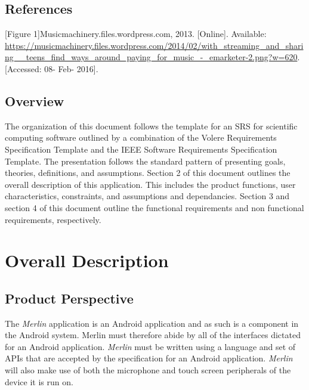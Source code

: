 \documentclass[]{article}
\newcommand{\merlin}{\textit{Merlin }}
\begin{document}
\subsection{References}
\label{sub:references}
\cbstart

[Figure 1]Musicmachinery.files.wordpress.com, 2013. [Online]. Available: \url{https://musicmachinery.files.wordpress.com/2014/02/with_streaming_and_sharing__teens_find_ways_around_paying_for_music_-_emarketer-2.png?w=620}. [Accessed: 08- Feb- 2016].
\cbend

\subsection{Overview}
\label{sub:overview}
	The organization of this document follows the template for an SRS for scientific computing software outlined by a combination of the Volere Requirements Specification Template and the IEEE Software Requirements Specification Template. The presentation follows the standard pattern of presenting goals, theories, definitions, and assumptions. Section 2 of this document outlines the overall description of this application. This includes the product functions, user characteristics, constraints, and assumptions and dependancies. Section 3 and section 4 of this document outline the functional requirements and non functional requirements, respectively. 


\section{Overall Description}
\label{sec:overall_description}

\subsection{Product Perspective}
\label{sub:product_perspective}
The \merlin application is an Android application and as such is a component in the Android system. Merlin must therefore abide by all of the interfaces dictated for an Android application. \merlin must be written using a language and set of APIs that are accepted by the specification for an Android application. \merlin will also make use of both the microphone and touch screen peripherals of the device it is run on.
\end{document}
